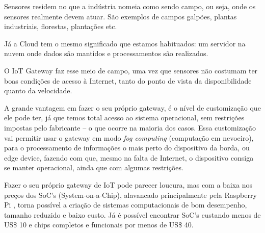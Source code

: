Sensores residem no que a indústria nomeia como sendo campo, ou seja, onde os sensores realmente devem atuar. São exemplos de campos galpões, plantas industriais, florestas, plantações etc.

Já a Cloud tem o mesmo significado que estamos habituados: um servidor na nuvem onde dados são mantidos e processamentos são realizados.

O IoT Gateway faz esse meio de campo, uma vez que sensores não costumam ter boas condições de acesso à Internet, tanto do ponto de vista da disponibilidade quanto da velocidade.

A grande vantagem em fazer o seu próprio gateway, é o nível de customização que ele pode ter, já que temos total acesso ao sistema operacional, sem restrições impostas pelo fabricante – o que ocorre na maioria dos casos. Essa customização vai permitir usar o gateway em modo \textit{fog computing} (computação em nevoeiro), para o processamento de informações o mais perto do dispositivo da borda, ou edge device, fazendo com que, mesmo na falta de Internet, o dispositivo consiga se manter operacional, ainda que com algumas restrições.

Fazer o seu próprio gateway de IoT pode parecer loucura, mas com a baixa nos preços dos SoC’s (System-on-a-Chip), alavancado principalmente pela Raspberry Pi \cite{RaspberryPi}, torna possível a criação de sistemas computacionais de bom desempenho, tamanho reduzido e baixo custo. Já é possível encontrar SoC’s custando menos de US\$ 10 e chips completos e funcionais por menos de US\$ 40. \cite{RaspberryPiVenda}